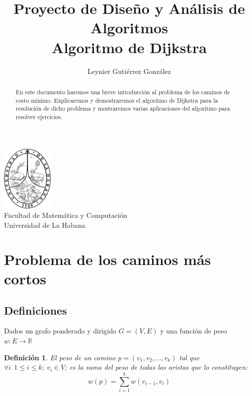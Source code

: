 \documentclass[12pt]{article}
\title{Proyecto de Diseño y Análisis de Algoritmos\\ \vspace{.2cm} \textbf{Algoritmo de Dijkstra}}
\author{Leynier Gutiérrez González}
\newcommand{\nl}{\vspace{0.3cm}}
\newtheorem{definition}{Definición}
\begin{document}
\maketitle

\vspace{0.5cm}

\begin{center}
	\vspace{0.2cm}
	\includegraphics[width=2.5cm]{images/escudo.png}\\
	\vspace{0.2cm}
	Facultad de Matemática y Computación\\
	\vspace{0.1cm}
	Universidad de La Habana\\
	\vspace{1cm}
\end{center}

\vspace{1cm}

\begin{abstract}
	En este documento haremos una breve introducción al problema de los caminos de costo mínimo. Explicaremos y demostraremos el algoritmo de Dijkstra para la resolución de dicho problema y mostraremos varias aplicaciones del algoritmo para resolver ejercicios.
\end{abstract}

\newpage

\tableofcontents

\newpage

\section{Problema de los caminos más cortos}

\subsection{Definiciones}

\nl

Dados un grafo ponderado y dirigido $G = (V, E)$ y una función de peso $w: E \rightarrow \mathbb{R}$

\begin{definition}
	El peso de un camino $p = (v_1, v_2, ... , v_k)$ tal que $\forall i \ \ 1 \leqslant i \leqslant k; \ v_i \in V$; es la suma del peso de todas las aristas que lo constituyen:
	$$w(p) = \sum_{i=1}^{k} w(v_{i-1}, v_i)$$
\end{definition}
\end{document}
